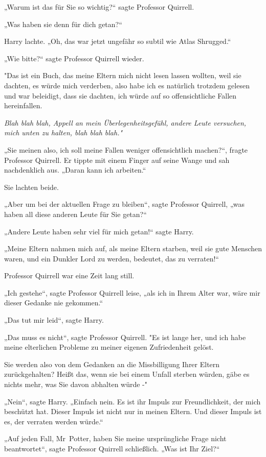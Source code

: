 {„Warum ist das für Sie so wichtig?“ sagte Professor Quirrell.

„Was haben sie denn für dich getan?“

Harry lachte. „Oh, das war jetzt ungefähr so subtil wie Atlas Shrugged.“

„Wie bitte?“ sagte Professor Quirrell wieder.

"Das ist ein Buch, das meine Eltern mich nicht lesen lassen wollten, weil sie dachten, es würde mich verderben, also habe ich es natürlich trotzdem gelesen und war beleidigt, dass sie dachten, ich würde auf so offensichtliche Fallen hereinfallen.

\emph{Blah blah blah, Appell an mein Überlegenheitsgefühl, andere Leute versuchen, mich unten zu halten, blah blah blah."}

„Sie meinen also, ich soll meine Fallen weniger offensichtlich machen?“, fragte Professor Quirrell. Er tippte mit einem Finger auf seine Wange und sah nachdenklich aus. „Daran kann ich arbeiten.“

Sie lachten beide.

„Aber um bei der aktuellen Frage zu bleiben“, sagte Professor Quirrell, „was haben all diese anderen Leute für Sie getan?“

„Andere Leute haben sehr viel für mich getan!“ sagte Harry.

„Meine Eltern nahmen mich auf, als meine Eltern starben, weil sie gute Menschen waren, und ein Dunkler Lord zu werden, bedeutet, das zu verraten!“

Professor Quirrell war eine Zeit lang still.

„Ich gestehe“, sagte Professor Quirrell leise, „als ich in Ihrem Alter war, wäre mir dieser Gedanke nie gekommen.“

„Das tut mir leid“, sagte Harry.

„Das muss es nicht“, sagte Professor Quirrell. "Es ist lange her, und ich habe meine elterlichen Probleme zu meiner eigenen Zufriedenheit gelöst.

Sie werden also von dem Gedanken an die Missbilligung Ihrer Eltern zurückgehalten? Heißt das, wenn sie bei einem Unfall sterben würden, gäbe es nichts mehr, was Sie davon abhalten würde -"

„Nein“, sagte Harry. „Einfach nein. Es ist ihr Impuls zur Freundlichkeit, der mich beschützt hat. Dieser Impuls ist nicht nur in meinen Eltern. Und dieser Impuls ist es, der verraten werden würde.“

„Auf jeden Fall, Mr~Potter, haben Sie meine ursprüngliche Frage nicht beantwortet“, sagte Professor Quirrell schließlich. „Was ist Ihr Ziel?“

}
